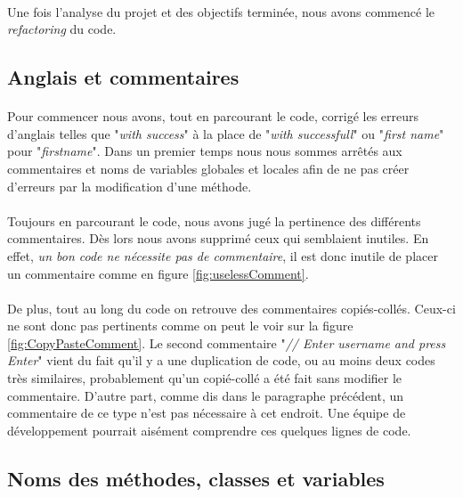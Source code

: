     \paragraph{}
    Une fois l'analyse du projet et des objectifs terminée, nous avons commencé le \textit{refactoring} du code.
    
\subsection{Anglais et commentaires}
    \paragraph{}
    Pour commencer nous avons, tout en parcourant le code, corrigé les erreurs d'anglais telles que "\textit{with success}" à la place de "\textit{with successfull}" ou "\textit{first name}" pour "\textit{firstname}". Dans un premier temps nous nous sommes arrêtés aux commentaires et noms de variables globales et locales afin de ne pas créer d'erreurs par la modification d'une méthode.
    \paragraph{}
    Toujours en parcourant le code, nous avons jugé la pertinence des différents commentaires. Dès lors nous avons supprimé ceux qui semblaient inutiles. En effet, \textit{un bon code ne nécessite pas de commentaire}, il est donc inutile de placer un commentaire comme en figure \ref{fig:uselessComment}. 
    
    \paragraph{}
    De plus, tout au long du code on retrouve des commentaires copiés-collés. Ceux-ci ne sont donc pas pertinents comme on peut le voir sur la figure \ref{fig:CopyPasteComment}. Le second commentaire "\textit{// Enter username and press Enter}" vient du fait qu'il y a une duplication de code, ou au moins deux codes très similaires, probablement qu'un copié-collé a été fait sans modifier le commentaire. D'autre part, comme dis dans le paragraphe précédent, un commentaire de ce type n'est pas nécessaire à cet endroit. Une équipe de développement pourrait aisément comprendre ces quelques lignes de code.
    
\subsection{Noms des méthodes, classes et variables}
    
